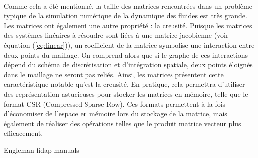 	\paragraph{}
	Comme cela a été mentionné, la taille des matrices rencontrées dans un problème typique de la simulation numérique de la dynamique des fluides est très grande.
	Les matrices ont également une autre propriété : la creusité.
	Puisque les matrices des systèmes linéaires à résoudre sont liées à une matrice jacobienne (voir équation (\ref{eq:linear})), un coefficient de la matrice symbolise une interaction entre deux points du maillage.
	On comprend alors que si le graphe de ces interactions dépend du schéma de discrétisation et d'intégration spatiale, deux points éloignés dans le maillage ne seront pas reliés.
	Ainsi, les matrices présentent cette caractéristique notable qu'est la creusité.
	En pratique, cela permettra d'utiliser des représentation astucieuses pour stocker les matrices en mémoire, telle que le format CSR (Compressed Sparse Row).
	Ces formats permettent à la fois d'économiser de l'espace en mémoire lors du stockage de la matrice, mais également de réaliser des opérations telles que le produit matrice vecteur plus efficacement.

Engleman fidap manuals

